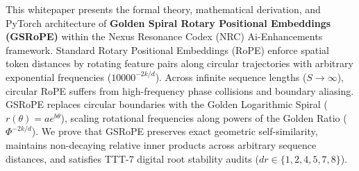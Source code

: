\begin{abstractbox}
This whitepaper presents the formal theory, mathematical derivation, and PyTorch architecture of \textbf{Golden Spiral Rotary Positional Embeddings (GSRoPE)} within the Nexus Resonance Codex (NRC) Ai-Enhancements framework. Standard Rotary Positional Embeddings (RoPE) enforce spatial token distances by rotating feature pairs along circular trajectories with arbitrary exponential frequencies ($10000^{-2k/d}$). Across infinite sequence lengths ($S \to \infty$), circular RoPE suffers from high-frequency phase collisions and boundary aliasing. GSRoPE replaces circular boundaries with the Golden Logarithmic Spiral ($r(\theta) = a e^{b \theta}$), scaling rotational frequencies along powers of the Golden Ratio ($\Phi^{-2k/d}$). We prove that GSRoPE preserves exact geometric self-similarity, maintains non-decaying relative inner products across arbitrary sequence distances, and satisfies TTT-7 digital root stability audits ($dr \in \{1, 2, 4, 5, 7, 8\}$).
\end{abstractbox}